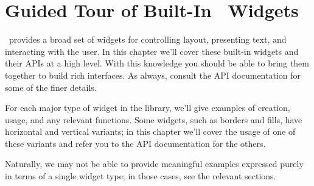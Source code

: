\chapter{Guided Tour of Built-In \vtyui\ Widgets}
\label{chap:guided_tour}

\vtyui\ provides a broad set of widgets for controlling layout,
presenting text, and interacting with the user.  In this chapter we'll
cover these built-in widgets and their APIs at a high level.  With
this knowledge you should be able to bring them together to build rich
interfaces.  As always, consult the API documentation for some of the
finer details.

For each major type of widget in the library, we'll give examples of
creation, usage, and any relevant functions.  Some widgets, such as
borders and fills, have horizontal and vertical variants; in this
chapter we'll cover the usage of one of these variants and refer you
to the API documentation for the others.

Naturally, we may not be able to provide meaningful examples expressed
purely in terms of a single widget type; in those cases, see the
relevant sections.


















